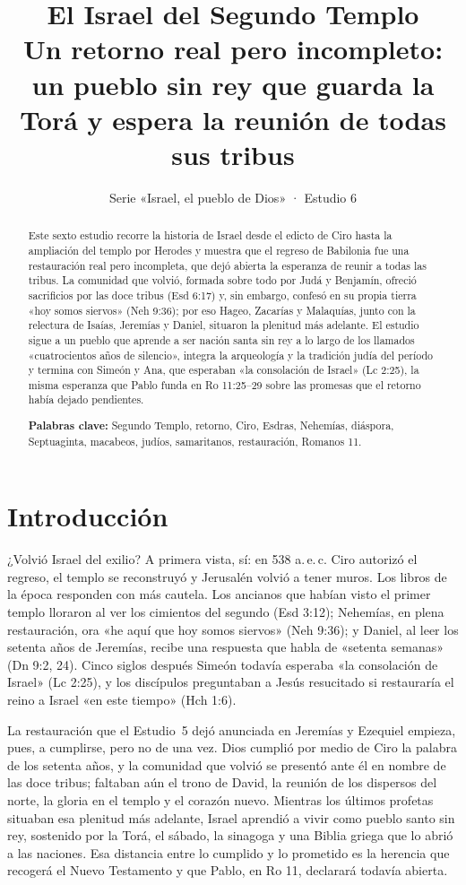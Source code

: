 \documentclass[11pt,letterpaper]{article}
\title{\color{ladrillo}\bfseries El Israel del Segundo Templo\\[4pt]\large\color{cafe}\mdseries Un retorno real pero incompleto: un pueblo sin rey que guarda la Torá y espera la reunión de todas sus tribus}
\author{}\date{\color{sepia}Serie «Israel, el pueblo de Dios» · Estudio 6}
\begin{document}
\maketitle\thispagestyle{empty}

\begin{abstract}\noindent
Este sexto estudio recorre la historia de Israel desde el edicto de Ciro hasta la ampliación del templo por Herodes y muestra que el regreso de Babilonia fue una restauración real pero incompleta, que dejó abierta la esperanza de reunir a todas las tribus. La comunidad que volvió, formada sobre todo por Judá y Benjamín, ofreció sacrificios por las doce tribus (Esd 6:17) y, sin embargo, confesó en su propia tierra «hoy somos siervos» (Neh 9:36); por eso Hageo, Zacarías y Malaquías, junto con la relectura de Isaías, Jeremías y Daniel, situaron la plenitud más adelante. El estudio sigue a un pueblo que aprende a ser nación santa sin rey a lo largo de los llamados «cuatrocientos años de silencio», integra la arqueología y la tradición judía del período y termina con Simeón y Ana, que esperaban «la consolación de Israel» (Lc 2:25), la misma esperanza que Pablo funda en Ro 11:25--29 sobre las promesas que el retorno había dejado pendientes.
\par\smallskip\noindent\textbf{Palabras clave:} Segundo Templo, retorno, Ciro, Esdras, Nehemías, diáspora, Septuaginta, macabeos, judíos, samaritanos, restauración, Romanos 11.
\end{abstract}

\section{Introducción}

¿Volvió Israel del exilio? A primera vista, sí: en 538 a.\,e.\,c. Ciro autorizó el regreso, el templo se reconstruyó y Jerusalén volvió a tener muros. Los libros de la época responden con más cautela. Los ancianos que habían visto el primer templo lloraron al ver los cimientos del segundo (Esd 3:12); Nehemías, en plena restauración, ora «he aquí que hoy somos siervos» (Neh 9:36); y Daniel, al leer los setenta años de Jeremías, recibe una respuesta que habla de «setenta semanas» (Dn 9:2, 24). Cinco siglos después Simeón todavía esperaba «la consolación de Israel» (Lc 2:25), y los discípulos preguntaban a Jesús resucitado si restauraría el reino a Israel «en este tiempo» (Hch 1:6).

La restauración que el Estudio~5 dejó anunciada en Jeremías y Ezequiel empieza, pues, a cumplirse, pero no de una vez. Dios cumplió por medio de Ciro la palabra de los setenta años, y la comunidad que volvió se presentó ante él en nombre de las doce tribus; faltaban aún el trono de David, la reunión de los dispersos del norte, la gloria en el templo y el corazón nuevo. Mientras los últimos profetas situaban esa plenitud más adelante, Israel aprendió a vivir como pueblo santo sin rey, sostenido por la Torá, el sábado, la sinagoga y una Biblia griega que lo abrió a las naciones. Esa distancia entre lo cumplido y lo prometido es la herencia que recogerá el Nuevo Testamento y que Pablo, en Ro 11, declarará todavía abierta.
\end{document}
